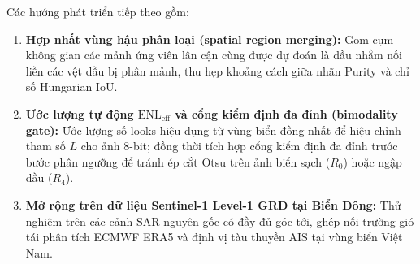 Các hướng phát triển tiếp theo gồm:
\begin{enumerate}
    \item \textbf{Hợp nhất vùng hậu phân loại (spatial region merging):} Gom cụm không gian các mảnh ứng viên lân cận cùng được dự đoán là dầu nhằm nối liền các vệt dầu bị phân mảnh, thu hẹp khoảng cách giữa nhãn Purity và chỉ số Hungarian IoU.
    \item \textbf{Ước lượng tự động $\text{ENL}_{\text{eff}}$ và cổng kiểm định đa đỉnh (bimodality gate):} Ước lượng số looks hiệu dụng từ vùng biển đồng nhất để hiệu chỉnh tham số $L$ cho ảnh 8-bit; đồng thời tích hợp cổng kiểm định đa đỉnh trước bước phân ngưỡng để tránh ép cắt Otsu trên ảnh biển sạch ($R_0$) hoặc ngập dầu ($R_4$).
    \item \textbf{Mở rộng trên dữ liệu Sentinel-1 Level-1 GRD tại Biển Đông:} Thử nghiệm trên các cảnh SAR nguyên gốc có đầy đủ góc tới, ghép nối trường gió tái phân tích ECMWF ERA5 và định vị tàu thuyền AIS tại vùng biển Việt Nam.
\end{enumerate}
